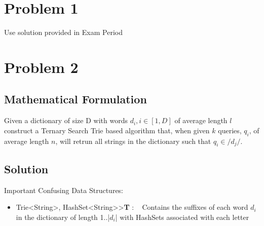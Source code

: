 \documentclass[12pt]{article}
\begin{document}

\newcommand{\hmwkClass}{COS 255}
\newcommand{\hmwkSemester}{Spring 2016}

\newcommand{\hmwkAuthorName}{Lukas Leung}
\newcommand{\hmwkAuthorID}{lleung}

\newcommand{\hmwkAssignmentNum}{Final}

\newcommand{\hmwkProblemNum}{}

\newcommand{\hmwkCollaborators}{}
\thispagestyle{fancycollab}

\section{Problem 1}
Use solution provided in Exam Period

\section{Problem 2}
\subsection{Mathematical Formulation}
Given a dictionary of size D with words $d_i, i \in [1,D]$ of average length $l$ construct a Ternary Search Trie
based algorithm that, when given $k$ queries, $q_i$, of average length $n$, will retrun all strings in the dictionary
such that $q_i \in /{d_j/}$.


\subsection{Solution}
Important Confusing Data Structures:
\begin{itemize}
    \item Trie\textless String\textgreater, HashSet\textless String\textgreater\textgreater \textbf{T} : ~ Contains
        the suffixes of each word $d_i$ in the dictionary of length 1..|$d_i$| with HashSets associated with each
        letter
\end{itemize}
\end{document}
